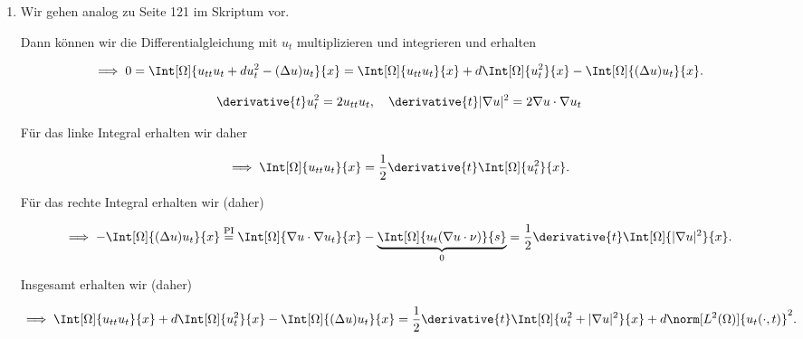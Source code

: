 \begin{solution}

\phantom{}

\begin{enumerate}[label = (\roman*)]

    \item Wir gehen analog zu Seite 121 im Skriptum vor.
    
    Dann können wir die Differentialgleichung mit $u_t$ multiplizieren und integrieren und erhalten

    \begin{align*}
        \implies
        0
        =
        \Int[\Omega]{u_{tt} u_t + d u_t^2 - (\Delta u) u_t}{x}
        =
        \Int[\Omega]{u_{tt} u_t}{x}
        +
        d \Int[\Omega]{u_t^2}{x}
        -
        \Int[\Omega]{(\Delta u) u_t}{x}.
    \end{align*}

    \begin{align*}
        \derivative{t} u_t^2 = 2 u_{tt} u_t,
        \quad
        \derivative{t} |\nabla u|^2 = 2 \nabla u \cdot \nabla u_t
    \end{align*}

    Für das linke Integral erhalten wir daher

    \begin{align*}
        \implies
        \Int[\Omega]{u_{tt} u_t}{x}
        =
        \frac{1}{2}
        \derivative{t}
        \Int[\Omega]{u_t^2}{x}.        
    \end{align*}

    Für das rechte Integral erhalten wir (daher)

    \begin{align*}
        \implies
        -\Int[\Omega]{(\Delta u) u_t}{x}
        \stackrel
        {
            \mathrm{PI}
        }{=}
        \Int[\Omega]{\nabla u \cdot \nabla u_t}{x}
        -
        \underbrace
        {
            \Int[\Omega]{u_t (\nabla u \cdot \nu)}{s}
        }_0
        =
        \frac{1}{2}
        \derivative{t}
        \Int[\Omega]{|\nabla u|^2}{x}.
    \end{align*}

    Insgesamt erhalten wir (daher)

    \begin{align*}
        \implies
        \Int[\Omega]{u_{tt} u_t}{x}
        +
        d \Int[\Omega]{u_t^2}{x}
        -
        \Int[\Omega]{(\Delta u) u_t}{x}
        =
        \frac{1}{2}
        \derivative{t}
        \Int[\Omega]{u_t^2 + |\nabla u|^2}{x}
        +
        d \norm[L^2(\Omega)]{u_t(\cdot, t)}^2.
    \end{align*}


\end{enumerate}
\end{solution}

